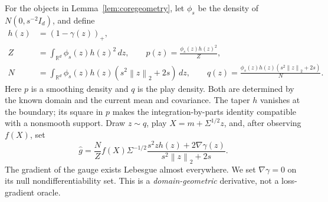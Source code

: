 \documentclass[11pt]{article}
\numberwithin{equation}{section}
\newcommand{\R}{\mathbb R}
\newcommand{\norm}[1]{\left\|#1\right\|}
\theoremstyle{definition}
\theoremstyle{remark}
\begin{document}
For the objects in Lemma~\ref{lem:coregeometry}, let $\phi_s$ be the density of
$N(0,s^{-2}I_d)$, and define
\begin{align}
 h(z)&=(1-\gamma(z))_+,\label{eq:h}\\
 Z&=\int_{\R^d}\phi_s(z)h(z)^2\,dz,\qquad
 p(z)=\frac{\phi_s(z)h(z)^2}{Z},\label{eq:p}\\
 N&=\int_{\R^d}\phi_s(z)h(z)(s^2\norm z_2+2s)\,dz,\qquad
 q(z)=\frac{\phi_s(z)h(z)(s^2\norm z_2+2s)}{N}.\label{eq:q}
\end{align}
Here $p$ is a smoothing density and $q$ is the play density. Both are determined by the known domain and the current mean and covariance.
The taper $h$ vanishes at the boundary; its square in $p$ makes the
integration-by-parts identity compatible with a nonsmooth support.
Draw $z\sim q$, play $X=m+\Sigma^{1/2}z$, and, after observing $f(X)$, set
\begin{equation}\label{eq:estimator}
 \widehat g=\frac NZ f(X)\Sigma^{-1/2}
 \frac{s^2 z h(z)+2\nabla\gamma(z)}{s^2\norm z_2+2s}.
\end{equation}
The gradient of the gauge exists Lebesgue almost everywhere. We set $\nabla\gamma=0$ on its
null nondifferentiability set. This is a
\emph{domain-geometric} derivative, not a loss-gradient oracle.
\end{document}
